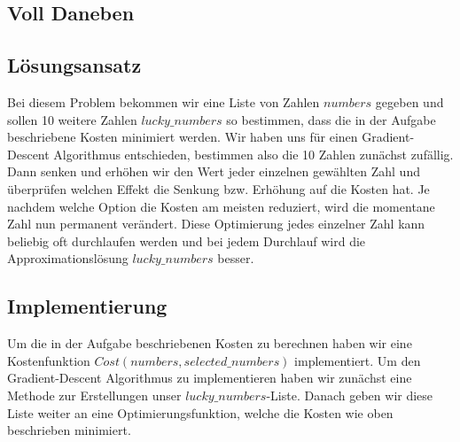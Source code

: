 \documentclass{article}
\begin{document}
\begin{flushleft}

\section{Voll Daneben}
\subsection{Lösungsansatz}
Bei diesem Problem bekommen wir eine  Liste von Zahlen $numbers$  gegeben und sollen 10 weitere Zahlen $lucky\_numbers$ so bestimmen, dass die in der Aufgabe beschriebene Kosten minimiert werden. Wir haben uns für einen Gradient-Descent Algorithmus entschieden, bestimmen also die 10 Zahlen zunächst zufällig. Dann senken und erhöhen wir den Wert jeder einzelnen gewählten Zahl und überprüfen welchen Effekt die Senkung bzw. Erhöhung auf die Kosten hat. Je nachdem welche Option die Kosten am meisten reduziert, wird die momentane Zahl nun permanent verändert. Diese Optimierung jedes einzelner Zahl kann beliebig oft durchlaufen werden und bei jedem Durchlauf wird die Approximationslösung $lucky\_numbers$ besser.
\subsection{Implementierung}

Um die in der Aufgabe beschriebenen Kosten zu berechnen haben wir eine Kostenfunktion $Cost(numbers,selected\_numbers)$ implementiert. Um den Gradient-Descent Algorithmus zu implementieren haben wir zunächst eine Methode zur Erstellungen unser $lucky\_numbers$-Liste. Danach geben wir diese Liste weiter an eine Optimierungsfunktion, welche die Kosten wie oben beschrieben minimiert.


\end{flushleft}
\end{document}
